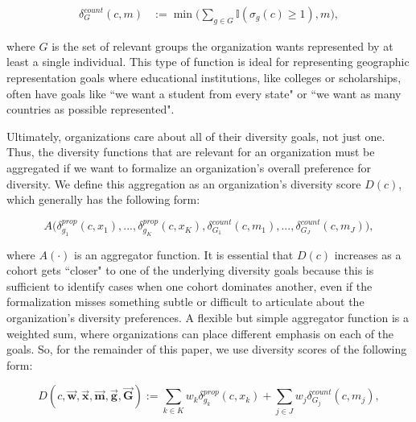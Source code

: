 \begin{equation} 
    \begin{split}
        \delta_G^{count}(c,m) &:= \min\big(\sum_{g \in G}\mathbb{I}(\sigma_g(c)\geq 1), m\big), \label{eq:count_div_function}
    \end{split}
\end{equation}

\noindent where $G$ is the set of relevant groups the organization wants represented by at least a single individual. This type of function is ideal for representing geographic representation goals where educational institutions, like colleges or scholarships, often have goals like ``we want a student from every state" or ``we want as many countries as possible represented". 

Ultimately, organizations care about all of their diversity goals, not just one. Thus, the diversity functions that are relevant for an organization must be aggregated if we want to formalize an organization's overall preference for diversity. We define this aggregation as an organization's diversity score $D(c)$, which generally has the following form: 

\begin{equation}
A\big(\delta_{g_1}^{prop}(c,x_1),...,\delta_{g_K}^{prop}(c,x_K),\delta_{G_1}^{count}(c, m_1),...,\delta_{G_J}^{count}(c, m_J)\big), \nonumber
\end{equation}

\noindent where $A(\cdot)$ is an aggregator function. It is essential that $D(c)$ increases as a cohort gets ``closer" to one of the underlying diversity goals because this is sufficient to identify cases when one cohort dominates another, even if the formalization misses something subtle or difficult to articulate about the organization's diversity preferences. A flexible but simple aggregator function is a weighted sum, where organizations can place different emphasis on each of the goals. So, for the remainder of this paper, we use diversity scores of the following form: 

\begin{equation}\label{eq:d_equation}
D(c,\vec{\mathbf{w}},\vec{\mathbf{x}},\vec{\mathbf{m}}, \vec{\mathbf{g}}, \vec{\mathbf{G}}) := \sum_{k\in K}w_k\delta_{g_k}^{prop}(c,x_k) + \sum_{j \in J}w_j\delta_{G_j}^{count}(c, m_j),
\end{equation}

